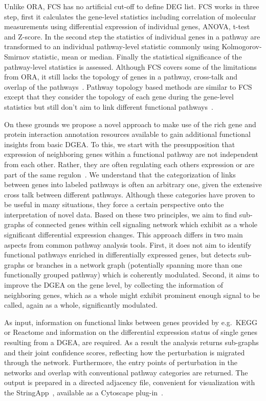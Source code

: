 \documentclass[10pt,a4paper,twocolumn]{article}
\begin{document}
Unlike ORA, FCS has no artificial cut-off to define DEG list. FCS
works in three step, first it calculates the gene-level statistics
including correlation of molecular measurements using differential
expression of individual genes, ANOVA, t-test and Z-score. In the
second step the statistics of individual genes in a pathway are
transformed to an individual pathway-level statistic commonly using
Kolmogorov-Smirnov statistic, mean or median. Finally the statistical
significance of the pathway-level statistics is assessed. Although FCS
covers some of the limitations from ORA, it still lacks the topology
of genes in a pathway, cross-talk and overlap of the
pathways~\cite{Khatri2012,Campos}. Pathway topology based methods are
similar to FCS except that they consider the topology of each gene
during the gene-level statistics but still don't aim to link different
functional pathways~\cite{Khatri2012}.

On these grounds we propose a novel approach to make use of the rich
gene and protein interaction annotation resources available to gain
additional functional insights from basic DGEA. To this, we start with
the presupposition that expression of neighboring genes within a
functional pathway are not independent from each other. Rather, they
are often regulating each others expression or are part of the same
regulon~\cite{Michalak}. We understand that the categorization of
links between genes into labeled pathways is often an arbitrary one,
given the extensive cross talk between different pathways. Although
these categories have proven to be useful in many situations, they
force a certain perspective onto the interpretation of novel
data. Based on these two principles, we aim to find sub-graphs of
connected genes within cell signaling network which exhibit as a whole
significant differential expression changes. This approach differs in
two main aspects from common pathway analysis tools. First, it does
not aim to identify functional pathways enriched in differentially
expressed genes, but detects sub-graphs or branches in a network graph
(potentially spanning more than one functionally grouped pathway)
which is coherently modulated. Second, it aims to improve the DGEA on
the gene level, by collecting the information of neighboring genes,
which as a whole might exhibit prominent enough signal to be called,
again as a whole, significantly modulated.

As input, information on functional links between genes provided by
e.g.~KEGG or Reactome and information on the differential expression
status of single genes resulting from a DGEA, are required. As a
result the analysis returns sub-graphs and their joint confidence
scores, reflecting how the perturbation is migrated through the
network. Furthermore, the entry points of perturbation in the networks
and overlap with conventional pathway categories are returned. The
output is prepared in a directed adjacency file, convenient for
visualization with the StringApp~\cite{StringApp}, available as a
Cytoscape plug-in~\cite{Cyto}.
\end{document}
